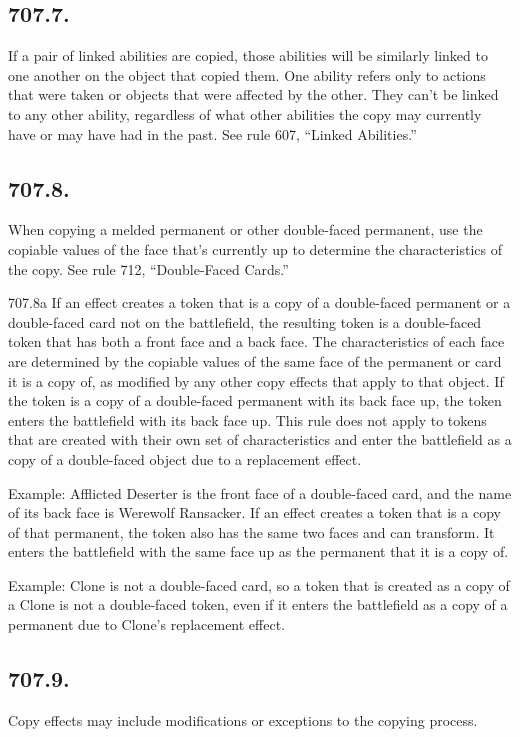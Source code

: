\subsection*{707.7.}
If a pair of linked abilities are copied, those abilities will be similarly linked to one another on the object that copied them. One ability refers only to actions that were taken or objects that were affected by the other. They can’t be linked to any other ability, regardless of what other abilities the copy may currently have or may have had in the past. See rule 607, “Linked Abilities.”

\subsection*{707.8.}
When copying a melded permanent or other double-faced permanent, use the copiable values of the face that’s currently up to determine the characteristics of the copy. See rule 712, “Double-Faced Cards.”

707.8a If an effect creates a token that is a copy of a double-faced permanent or a double-faced card not on the battlefield, the resulting token is a double-faced token that has both a front face and a back face. The characteristics of each face are determined by the copiable values of the same face of the permanent or card it is a copy of, as modified by any other copy effects that apply to that object. If the token is a copy of a double-faced permanent with its back face up, the token enters the battlefield with its back face up. This rule does not apply to tokens that are created with their own set of characteristics and enter the battlefield as a copy of a double-faced object due to a replacement effect.

Example: Afflicted Deserter is the front face of a double-faced card, and the name of its back face is Werewolf Ransacker. If an effect creates a token that is a copy of that permanent, the token also has the same two faces and can transform. It enters the battlefield with the same face up as the permanent that it is a copy of.

Example: Clone is not a double-faced card, so a token that is created as a copy of a Clone is not a double-faced token, even if it enters the battlefield as a copy of a permanent due to Clone’s replacement effect.

\subsection*{707.9.}
Copy effects may include modifications or exceptions to the copying process.

